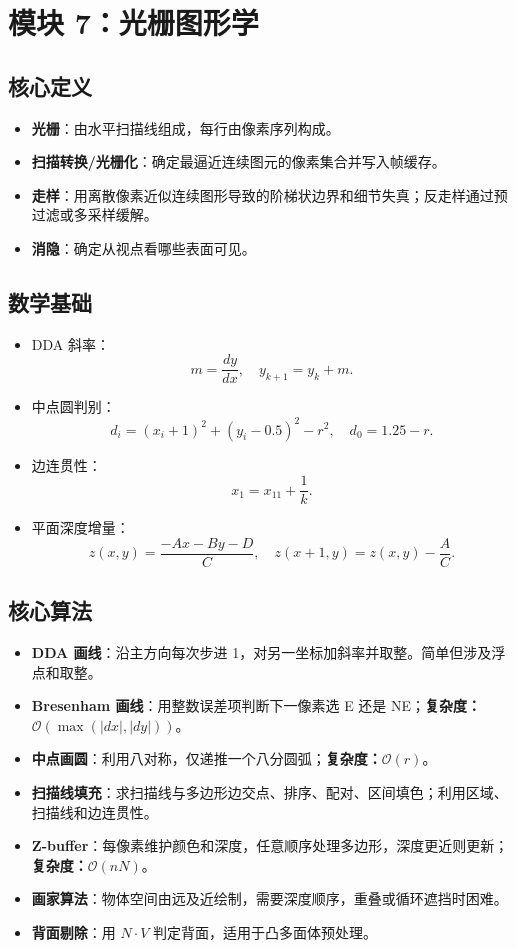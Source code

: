 \documentclass[UTF8,zihao=-4,scheme=chinese,fontset=fandol]{ctexart}
\newcommand{\key}[1]{\textbf{#1}}
\newcommand{\complexity}[1]{\textbf{复杂度：}#1}
\begin{document}
\section{模块 7：光栅图形学}

\subsection{核心定义}
\begin{itemize}
  \item \key{光栅}：由水平扫描线组成，每行由像素序列构成。
  \item \key{扫描转换/光栅化}：确定最逼近连续图元的像素集合并写入帧缓存。
  \item \key{走样}：用离散像素近似连续图形导致的阶梯状边界和细节失真；反走样通过预过滤或多采样缓解。
  \item \key{消隐}：确定从视点看哪些表面可见。
\end{itemize}

\subsection{数学基础}
\begin{itemize}
  \item DDA 斜率：
  \[
  m=\frac{dy}{dx},\quad y_{k+1}=y_k+m.
  \]
  \item 中点圆判别：
  \[
  d_i=(x_i+1)^2+(y_i-0.5)^2-r^2,\quad d_0=1.25-r.
  \]
  \item 边连贯性：
  \[
  x_1=x_{11}+\frac1k.
  \]
  \item 平面深度增量：
  \[
  z(x,y)=\frac{-Ax-By-D}{C},\quad
  z(x+1,y)=z(x,y)-\frac AC.
  \]
\end{itemize}

\subsection{核心算法}
\begin{itemize}
  \item \key{DDA 画线}：沿主方向每次步进 1，对另一坐标加斜率并取整。简单但涉及浮点和取整。
  \item \key{Bresenham 画线}：用整数误差项判断下一像素选 E 还是 NE；\complexity{$\mathcal O(\max(|dx|,|dy|))$。}
  \item \key{中点画圆}：利用八对称，仅递推一个八分圆弧；\complexity{$\mathcal O(r)$。}
  \item \key{扫描线填充}：求扫描线与多边形边交点、排序、配对、区间填色；利用区域、扫描线和边连贯性。
  \item \key{Z-buffer}：每像素维护颜色和深度，任意顺序处理多边形，深度更近则更新；\complexity{$\mathcal O(nN)$。}
  \item \key{画家算法}：物体空间由远及近绘制，需要深度顺序，重叠或循环遮挡时困难。
  \item \key{背面剔除}：用 $N\cdot V$ 判定背面，适用于凸多面体预处理。
\end{itemize}
\end{document}

